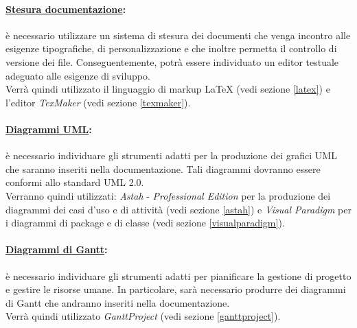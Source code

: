 \paragraph{\underline{Stesura documentazione}:} è necessario utilizzare un sistema di stesura dei documenti che venga incontro alle esigenze tipografiche, di personalizzazione e che inoltre permetta il controllo di versione dei file. Conseguentemente, potrà essere individuato un editor testuale adeguato alle esigenze di sviluppo.\\
Verrà quindi utilizzato il linguaggio di markup\g{} \LaTeX{} (vedi sezione \ref{latex}) e l'editor \textit{TexMaker}  (vedi sezione \ref{texmaker}).

\paragraph{\underline{Diagrammi UML}:} è necessario individuare gli strumenti adatti per la produzione dei grafici UML\g{} che saranno inseriti nella documentazione. Tali diagrammi dovranno essere conformi allo standard UML\g{} 2.0.\\
Verranno quindi utilizzati: \textit{Astah}\g{} - \textit{Professional Edition} per la produzione dei diagrammi dei casi d'uso e di attività (vedi sezione \ref{astah}) e \textit{Visual Paradigm} per i diagrammi di package e di classe (vedi sezione \ref{visualparadigm}). 

\paragraph{\underline{Diagrammi di Gantt}:} è necessario individuare gli strumenti adatti per pianificare la gestione di progetto e gestire le risorse umane. In particolare, sarà necessario produrre dei diagrammi di Gantt\g{} che andranno inseriti nella documentazione.\\
Verrà quindi utilizzato \textit{GanttProject}\g{} (vedi sezione \ref{ganttproject}).

